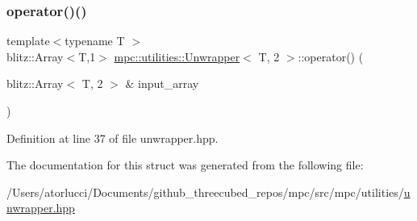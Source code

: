 \subsubsection{\texorpdfstring{operator()()}{operator()()}}
{\footnotesize\ttfamily template$<$typename T $>$ \\
blitz\+::\+Array$<$T,1$>$ \mbox{\hyperlink{structmpc_1_1utilities_1_1_unwrapper}{mpc\+::utilities\+::\+Unwrapper}}$<$ T, 2 $>$\+::operator() (\begin{DoxyParamCaption}\item[{blitz\+::\+Array$<$ T, 2 $>$ \&}]{input\+\_\+array }\end{DoxyParamCaption})\hspace{0.3cm}{\ttfamily [inline]}}



Definition at line 37 of file unwrapper.\+hpp.



The documentation for this struct was generated from the following file\+:\begin{DoxyCompactItemize}
\item 
/\+Users/atorlucci/\+Documents/github\+\_\+threecubed\+\_\+repos/mpc/src/mpc/utilities/\mbox{\hyperlink{unwrapper_8hpp}{unwrapper.\+hpp}}\end{DoxyCompactItemize}

